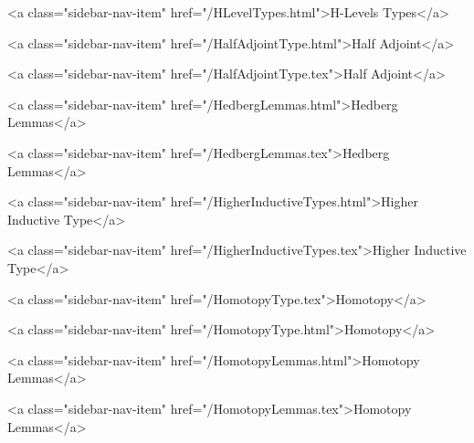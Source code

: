       
        
          <a class="sidebar-nav-item" href="/HLevelTypes.html">H-Levels Types</a>
        
      
    
      
        
          <a class="sidebar-nav-item" href="/HalfAdjointType.html">Half Adjoint</a>
        
      
    
      
        
          <a class="sidebar-nav-item" href="/HalfAdjointType.tex">Half Adjoint</a>
        
      
    
      
        
          <a class="sidebar-nav-item" href="/HedbergLemmas.html">Hedberg Lemmas</a>
        
      
    
      
        
          <a class="sidebar-nav-item" href="/HedbergLemmas.tex">Hedberg Lemmas</a>
        
      
    
      
        
          <a class="sidebar-nav-item" href="/HigherInductiveTypes.html">Higher Inductive Type</a>
        
      
    
      
        
          <a class="sidebar-nav-item" href="/HigherInductiveTypes.tex">Higher Inductive Type</a>
        
      
    
      
        
          <a class="sidebar-nav-item" href="/HomotopyType.tex">Homotopy</a>
        
      
    
      
        
          <a class="sidebar-nav-item" href="/HomotopyType.html">Homotopy</a>
        
      
    
      
        
          <a class="sidebar-nav-item" href="/HomotopyLemmas.html">Homotopy Lemmas</a>
        
      
    
      
        
          <a class="sidebar-nav-item" href="/HomotopyLemmas.tex">Homotopy Lemmas</a>
        
